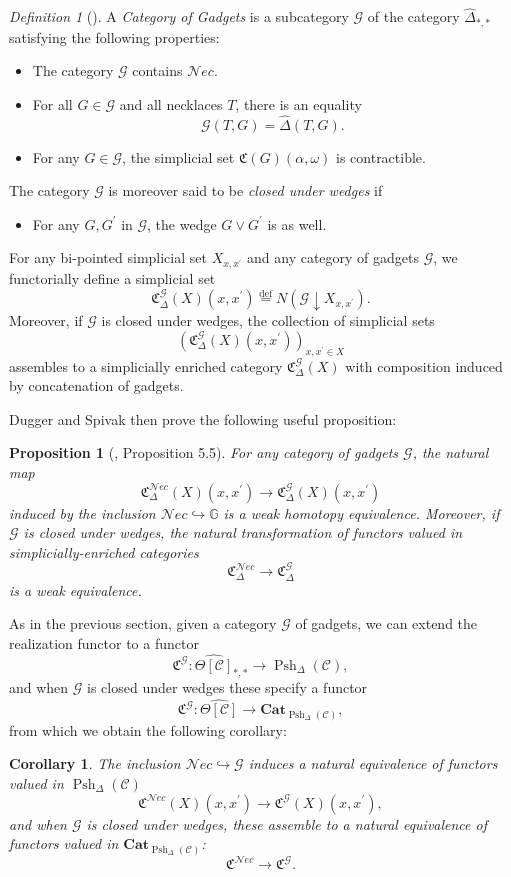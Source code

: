\documentclass{amsart}
\numberwithin{equation}{section}
\theoremstyle{plain}   %
\newtheorem{prop}[subsection]{Proposition}
\newtheorem{cor}[subsection]{Corollary}
\theoremstyle{remark}
\newtheorem{defn}[subsection]{Definition}
\theoremstyle{plain}
\newcommand{\Nec}{\ensuremath{{\mathcal{N}ec}}}
\newcommand{\Cat}{\ensuremath{\mathbf{Cat}}}
\newcommand{\overcat}[2]{{\left(#1\downarrow #2\right)}}
\newcommand{\psh}[1]{\ensuremath{\widehat{#1}}}
\newcommand{\G}{\ensuremath{\mathbb{G}}}
\newcommand{\defeq}{\overset{\mathrm{def}}=}
\newcommand{\cellset}{\ensuremath{\widehat{\Theta[\mathcal{C}]}}}
\newcommand{\spsh}{\ensuremath{\operatorname{Psh}_\Delta(\mathcal{C})}}
\begin{document}
\begin{defn}[\cite{ds1}]
	A \emph{Category of Gadgets} is a subcategory \(\mathcal{G}\) of the category \(\psh{\Delta}_{\ast,\ast}\) satisfying the following properties:
	\begin{itemize}
		\item The category \(\mathcal{G}\) contains \(\Nec\).
		\item For all \(G\in \mathcal{G}\) and all necklaces \(T\), there is an equality 
		\[
			\mathcal{G}(T,G) = \psh{\Delta}(T,G).
		\]
		\item For any \(G \in \mathcal{G}\), the simplicial set \(\mathfrak{C}(G)(\alpha,\omega)\) is contractible.
	\end{itemize}
	The category \(\mathcal{G}\) is moreover said to be \emph{closed under wedges} if
	\begin{itemize}
		\item For any \(G, G^\prime\) in \(\mathcal{G}\), the wedge \(G\vee G^\prime\) is as well.
	\end{itemize}
	For any bi-pointed simplicial set \(X_{x,x^\prime}\) and any category of gadgets \(\mathcal{G}\), we functorially define a simplicial set 
	\[
		\mathfrak{C}^{\mathcal{G}}_\Delta(X)(x,x^\prime)\defeq N\overcat{\mathcal{G}}{X_{x,x^\prime}}.
	\]
	Moreover, if \(\mathcal{G}\) is closed under wedges, the collection of simplicial sets 
	\[
		(\mathfrak{C}^{\mathcal{G}}_\Delta(X)(x,x^\prime))_{x,x^\prime \in X}
	\]
	assembles to a simplicially enriched category \(\mathfrak{C}^{\mathcal{G}}_\Delta(X)\) with composition induced by concatenation of gadgets.
\end{defn}

Dugger and Spivak then prove the following useful proposition:

\begin{prop}[\cite{ds1}, Proposition 5.5]
	For any category of gadgets \(\mathcal{G}\), the natural map
	\[\mathfrak{C}^{\Nec}_\Delta(X)(x,x^\prime)\to \mathfrak{C}^{\mathcal{G}}_\Delta(X)(x,x^\prime)\]
	induced by the inclusion \(\Nec \hookrightarrow \G\) is a weak homotopy equivalence.  Moreover, if \(\mathcal{G}\) is closed under wedges, the natural transformation of functors valued in simplicially-enriched categories
	\[\mathfrak{C}^{\Nec}_\Delta\to \mathfrak{C}^{\mathcal{G}}_\Delta\]
	is a weak equivalence.
\end{prop}

As in the previous section, given a category \(\mathcal{G}\) of gadgets, we can extend the realization functor to a functor
\[
	\mathfrak{C}^\mathcal{G}:\cellset_{\ast,\ast} \to \spsh,
\]
and when \(\mathcal{G}\) is closed under wedges these specify a functor
\[
	\mathfrak{C}^\mathcal{G}:\cellset \to \Cat_{\spsh},
\]
from which we obtain the following corollary:
\begin{cor}\label{gadgetlemma}
	The inclusion \(\Nec\hookrightarrow \mathcal{G}\) induces a natural equivalence of functors valued in \(\spsh\)
	\[\mathfrak{C}^{\Nec}(X)(x,x^\prime)\to \mathfrak{C}^{\mathcal{G}}(X)(x,x^\prime),\]
	and when \(\mathcal{G}\) is closed under wedges, these assemble to a natural equivalence of functors valued in \(\Cat_{\spsh}\):
	\[\mathfrak{C}^{\Nec}\to \mathfrak{C}^{\mathcal{G}}.\]
\end{cor}
\end{document}
